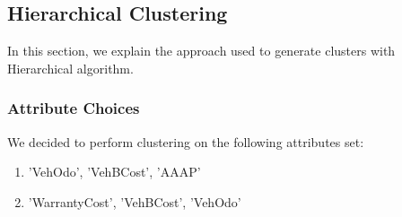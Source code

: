 \documentclass{article}
\begin{document}
	\subsection{Hierarchical Clustering}
	In this section, we explain the approach used to generate clusters with Hierarchical algorithm.
	\subsubsection{Attribute Choices}
	We decided to perform clustering on the following attributes set:
	\begin{enumerate}
		\item 'VehOdo', 'VehBCost', 'AAAP'
		\item 'WarrantyCost', 'VehBCost', 'VehOdo'
	\end{enumerate}
	
\end{document}
